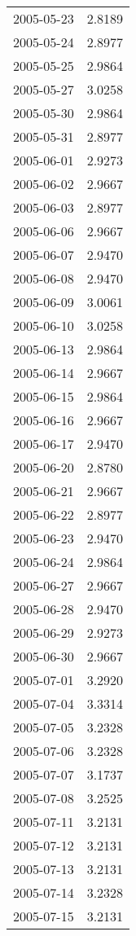 \begin{tabular}{lr}
2005-05-23 &      2.8189 \\
2005-05-24 &      2.8977 \\
2005-05-25 &      2.9864 \\
2005-05-27 &      3.0258 \\
2005-05-30 &      2.9864 \\
2005-05-31 &      2.8977 \\
2005-06-01 &      2.9273 \\
2005-06-02 &      2.9667 \\
2005-06-03 &      2.8977 \\
2005-06-06 &      2.9667 \\
2005-06-07 &      2.9470 \\
2005-06-08 &      2.9470 \\
2005-06-09 &      3.0061 \\
2005-06-10 &      3.0258 \\
2005-06-13 &      2.9864 \\
2005-06-14 &      2.9667 \\
2005-06-15 &      2.9864 \\
2005-06-16 &      2.9667 \\
2005-06-17 &      2.9470 \\
2005-06-20 &      2.8780 \\
2005-06-21 &      2.9667 \\
2005-06-22 &      2.8977 \\
2005-06-23 &      2.9470 \\
2005-06-24 &      2.9864 \\
2005-06-27 &      2.9667 \\
2005-06-28 &      2.9470 \\
2005-06-29 &      2.9273 \\
2005-06-30 &      2.9667 \\
2005-07-01 &      3.2920 \\
2005-07-04 &      3.3314 \\
2005-07-05 &      3.2328 \\
2005-07-06 &      3.2328 \\
2005-07-07 &      3.1737 \\
2005-07-08 &      3.2525 \\
2005-07-11 &      3.2131 \\
2005-07-12 &      3.2131 \\
2005-07-13 &      3.2131 \\
2005-07-14 &      3.2328 \\
2005-07-15 &      3.2131 \\

\end{tabular}
